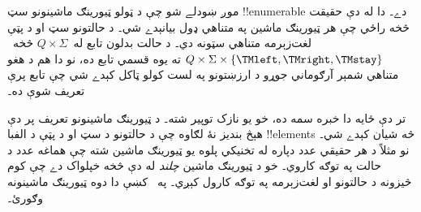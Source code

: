\documentclass[../../../include/open-logic-section]{subfiles}
\begin{document}

\begin{explain}
موږ ښودلے شو چې د ټولو ټيورينګ ماشينونو سټ !!{enumerable} دے۔ دا
له دې حقيقت څخه راځي چې هر ټيورينګ ماشين په متناهي ډول بيانېدے شي۔
د حالتونو سټ او د پټې لغت‌زېرمه متناهي سټونه دي۔ د حالت بدلون تابع
له~$Q \times \Sigma$ څخه~$Q \times \Sigma \times \{\TMleft,
\TMright, \TMstay\}$ ته يوه قسمي تابع ده، نو دا هم د هغو متناهي
شمېر آرګوماني جوړو د ارزښتونو په لست کولو ټاکل کېدے شي چې تابع پرې
تعريف شوې ده۔

تر دې ځايه دا خبره سمه ده، خو يو نازک توپير شته۔ د ټيورينګ ماشينونو
تعريف پر دې هېڅ بنديز نۀ لګاوه چې د حالتونو د سټ او د پټې د الفبا
!!{element}s څه شيان کېدے شي۔ نو مثلاً د هر حقيقي عدد دپاره له تخنيکي
پلوه يو ټيورينګ ماشين شته چې هماغه عدد د حالت په توګه کاروي۔ خو د
ټيورينګ ماشين \emph{چلند} له دې څخه خپلواک دے چې کوم څيزونه د حالتونو
او لغت‌زېرمه په توګه کارول کېږي۔ په~ کښې دا دوه
ټيورينګ ماشينونه وګورئ۔
\begin{figure}
\begin{center}
\\
\end{center}
\end{figure}
\end{explain}
\end{document}
